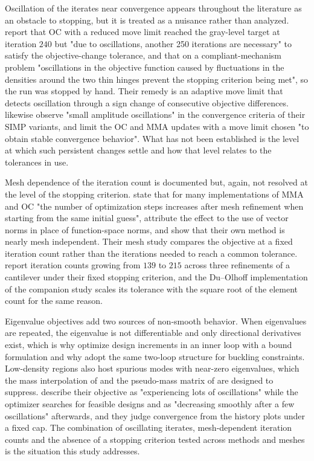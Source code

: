 \documentclass[11pt,a4paper]{article}
\begin{document}
Oscillation of the iterates near convergence appears throughout the literature as an obstacle to stopping, but it is treated as a nuisance rather than analyzed. \citet{Dunning2025} report that OC with a reduced move limit reached the gray-level target at iteration $240$ but "due to oscillations, another 250 iterations are necessary" to satisfy the objective-change tolerance, and that on a compliant-mechanism problem "oscillations in the objective function caused by fluctuations in the densities around the two thin hinges prevent the stopping criterion being met", so the run was stopped by hand. Their remedy is an adaptive move limit that detects oscillation through a sign change of consecutive objective differences. \citet{Yago2022} likewise observe "small amplitude oscillations" in the convergence criteria of their SIMP variants, and \citet{Kim2025} limit the OC and MMA updates with a move limit chosen "to obtain stable convergence behavior". What has not been established is the level at which such persistent changes settle and how that level relates to the tolerances in use.

Mesh dependence of the iteration count is documented but, again, not resolved at the level of the stopping criterion. \citet{Kim2025} state that for many implementations of MMA and OC "the number of optimization steps increases after mesh refinement when starting from the same initial guess", attribute the effect to the use of vector norms in place of function-space norms, and show that their own method is nearly mesh independent. Their mesh study compares the objective at a fixed iteration count rather than the iterations needed to reach a common tolerance. \citet{Dunning2025} report iteration counts growing from $139$ to $215$ across three refinements of a cantilever under their fixed stopping criterion, and the Du--Olhoff implementation of the companion study scales its tolerance with the square root of the element count for the same reason.

Eigenvalue objectives add two sources of non-smooth behavior. When eigenvalues are repeated, the eigenvalue is not differentiable and only directional derivatives exist, which is why \citet{Du2007} optimize design increments in an inner loop with a bound formulation and why \citet{Zhang2023} adopt the same two-loop structure for buckling constraints. Low-density regions also host spurious modes with near-zero eigenvalues, which the mass interpolation of \citet{Du2007} and the pseudo-mass matrix of \citet{Zhang2023} are designed to suppress. \citet{Zhang2023} describe their objective as "experiencing lots of oscillations" while the optimizer searches for feasible designs and as "decreasing smoothly after a few oscillations" afterwards, and they judge convergence from the history plots under a fixed cap. The combination of oscillating iterates, mesh-dependent iteration counts and the absence of a stopping criterion tested across methods and meshes is the situation this study addresses.
\end{document}
